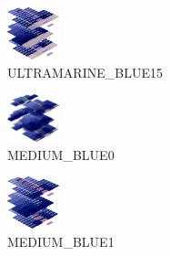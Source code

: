 \hspace{0.1cm}
\begin{minipage}[b]{0.15\linewidth}
\begin{figure}[H]                                                          
  \centering                                                             
  \begin{adjustbox}{width=1.5cm,center}                                   
  \includegraphics[width=1.5cm]{src/colorspace_colourflow/flows/colourflow_127-45.png}%
  \end{adjustbox}                                                        
\caption*{ULTRAMARINE\_BLUE15}                                           
\end{figure}                                                               
\end{minipage}
\hspace{0.1cm}
\begin{minipage}[b]{0.15\linewidth}
\begin{figure}[H]                                                          
  \centering                                                             
  \begin{adjustbox}{width=1.5cm,center}                                   
  \includegraphics[width=1.5cm]{src/colorspace_colourflow/flows/colourflow_128-45.png}%
  \end{adjustbox}                                                        
\caption*{MEDIUM\_BLUE0}                                           
\end{figure}                                                               
\end{minipage}
\hspace{0.1cm}
\begin{minipage}[b]{0.15\linewidth}
\begin{figure}[H]                                                          
  \centering                                                             
  \begin{adjustbox}{width=1.5cm,center}                                   
  \includegraphics[width=1.5cm]{src/colorspace_colourflow/flows/colourflow_129-45.png}%
  \end{adjustbox}                                                        
\caption*{MEDIUM\_BLUE1}                                           
\end{figure}                                                               
\end{minipage}
